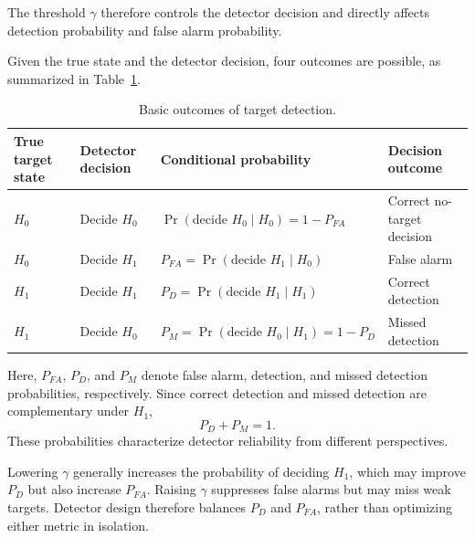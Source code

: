 The threshold \(\gamma\) therefore controls the detector decision and directly
affects detection probability and false alarm probability.

Given the true state and the detector decision, four outcomes are possible, as
summarized in Table~\ref{tab:detection_outcomes}.

\begin{table}[htbp]
    \centering
    \caption{Basic outcomes of target detection.}
    \label{tab:detection_outcomes}
    \small
    \renewcommand{\arraystretch}{1.25}
    \begin{tabularx}{\textwidth}{
        >{\centering\arraybackslash}p{}
        >{\centering\arraybackslash}p{}
        >{\centering\arraybackslash}p{}
        >{\raggedright\arraybackslash}X
    }
        \toprule
        True target state
        & Detector decision
        & Conditional probability
        & Decision outcome \\
        \midrule

        \(H_0\)
        & Decide \(H_0\)
        & \(\Pr(\text{decide }H_0 \mid H_0)=1-P_{FA}\)
        & Correct no-target decision \\

        \(H_0\)
        & Decide \(H_1\)
        & \(P_{FA}=\Pr(\text{decide }H_1 \mid H_0)\)
        & False alarm \\

        \(H_1\)
        & Decide \(H_1\)
        & \(P_D=\Pr(\text{decide }H_1 \mid H_1)\)
        & Correct detection \\

        \(H_1\)
        & Decide \(H_0\)
        & \(P_M=\Pr(\text{decide }H_0 \mid H_1)=1-P_D\)
        & Missed detection \\
        \bottomrule
    \end{tabularx}
\end{table}

Here, \(P_{FA}\), \(P_D\), and \(P_M\) denote false alarm, detection, and missed
detection probabilities, respectively.
Since correct detection and missed detection are complementary under \(H_1\),
\begin{equation}
    P_D+P_M=1.
    \label{eq:detection_missed_relation}
\end{equation}
These probabilities characterize detector reliability from different
perspectives.

Lowering \(\gamma\) generally increases the probability of deciding \(H_1\),
which may improve \(P_D\) but also increase \(P_{FA}\).
Raising \(\gamma\) suppresses false alarms but may miss weak targets.
Detector design therefore balances \(P_D\) and \(P_{FA}\), rather than
optimizing either metric in isolation.

